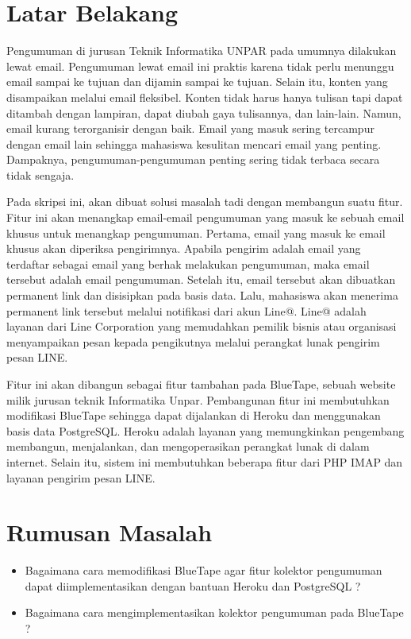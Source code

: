 \documentclass[a4paper,twoside]{article}
\begin{document}
\section{Latar Belakang}
Pengumuman di jurusan Teknik Informatika UNPAR pada umumnya dilakukan lewat email. Pengumuman lewat email ini praktis karena tidak perlu menunggu email sampai ke tujuan dan dijamin sampai ke tujuan. Selain itu, konten yang disampaikan melalui email fleksibel. Konten tidak harus hanya tulisan tapi dapat ditambah dengan lampiran, dapat diubah gaya tulisannya, dan lain-lain. Namun, email kurang terorganisir dengan baik. Email yang masuk sering tercampur dengan email lain sehingga mahasiswa kesulitan mencari email yang penting. Dampaknya, pengumuman-pengumuman penting sering tidak terbaca secara tidak sengaja.

Pada skripsi ini, akan dibuat solusi masalah tadi dengan membangun suatu fitur. Fitur ini akan menangkap email-email pengumuman yang masuk ke sebuah email khusus untuk menangkap pengumuman. Pertama, email yang masuk ke email khusus akan diperiksa pengirimnya. Apabila pengirim adalah email yang terdaftar sebagai email yang berhak melakukan pengumuman, maka email tersebut adalah email pengumuman. Setelah itu, email tersebut akan dibuatkan permanent link dan disisipkan pada basis data. Lalu, mahasiswa akan menerima permanent link tersebut melalui notifikasi dari akun Line@. Line@ adalah layanan dari Line Corporation yang memudahkan pemilik bisnis atau organisasi menyampaikan pesan kepada pengikutnya melalui perangkat lunak pengirim pesan LINE.

Fitur ini akan dibangun sebagai fitur tambahan pada BlueTape, sebuah website milik jurusan teknik Informatika Unpar. Pembangunan fitur ini membutuhkan modifikasi BlueTape sehingga dapat dijalankan di Heroku dan menggunakan basis data PostgreSQL. Heroku adalah layanan yang memungkinkan pengembang membangun, menjalankan, dan mengoperasikan perangkat lunak di dalam internet. Selain itu, sistem ini membutuhkan beberapa fitur dari PHP IMAP dan layanan pengirim pesan LINE.

\section{Rumusan Masalah}
\begin{itemize}
\item Bagaimana cara memodifikasi BlueTape agar fitur kolektor pengumuman dapat diimplementasikan dengan bantuan Heroku dan PostgreSQL ?
\item Bagaimana cara mengimplementasikan kolektor pengumuman pada BlueTape ?
\end{itemize}
\end{document}
